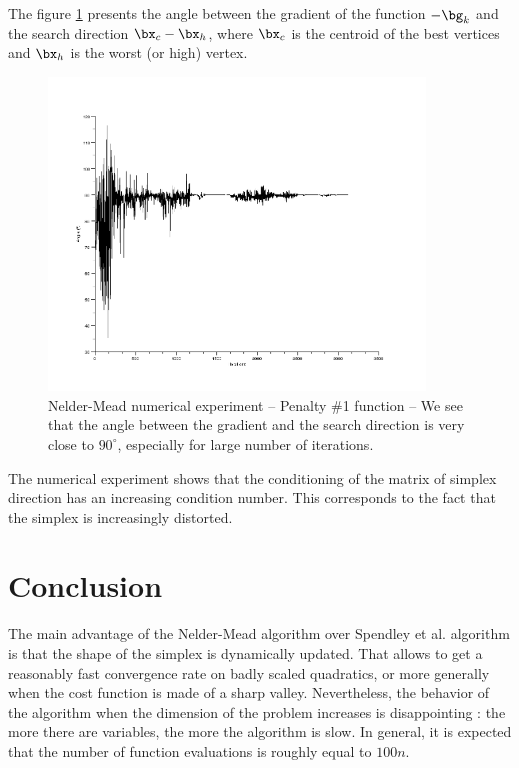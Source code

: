 The figure \ref{fig-nm-numexp-torczon1} presents the 
angle between the gradient of the function $-\bg_k$ and the search 
direction $\bx_c - \bx_h$, where $\bx_c$ is the centroid of the best 
vertices and $\bx_h$ is the worst (or high) vertex.

\begin{figure}
\begin{center}
\includegraphics[width=10cm]{neldermeadmethod/torczon_test1_angle.png}
\end{center}
\caption{Nelder-Mead numerical experiment -- Penalty \#1 function --
We see that the angle between the gradient and the search direction
is very close to $90^{\circ}$, especially for large number of iterations.}
\label{fig-nm-numexp-torczon1}
\end{figure}

The numerical experiment shows that the conditioning of the matrix 
of simplex direction has an increasing condition number. This corresponds to the 
fact that the simplex is increasingly distorted.

\section{Conclusion}

The main advantage of the Nelder-Mead algorithm over Spendley et al.
algorithm is that the shape of the simplex is dynamically updated.
That allows to get a reasonably fast convergence rate on badly scaled
quadratics, or more generally when the cost function is made 
of a sharp valley. Nevertheless, the behavior of the algorithm when the 
dimension of the problem increases is disappointing : the more there are 
variables, the more the algorithm is slow. In general, it is expected 
that the number of function evaluations is roughly equal to $100n$.

